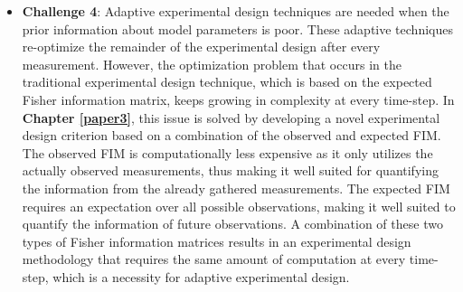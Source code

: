 \begin{itemize}
	\item \textbf{Challenge 4}: Adaptive experimental design techniques are needed when the prior information about model parameters is poor. These adaptive techniques re-optimize the remainder of the experimental design after every measurement. However, the optimization problem that occurs in the traditional experimental design technique, which is based on the expected Fisher information matrix, keeps growing in complexity at every time-step. In \textbf{Chapter \ref{paper3}}, this issue is solved by developing a novel experimental design criterion based on a combination of the observed and expected FIM. The observed FIM is computationally less expensive as it only utilizes the actually observed measurements, thus making it well suited for quantifying the information from the already gathered measurements. The expected FIM requires an expectation over all possible observations, making it well suited to quantify the information of future observations. A combination of these two types of Fisher information matrices results in an experimental design methodology that requires the same amount of computation at every time-step, which is a necessity for adaptive experimental design.
\end{itemize} 